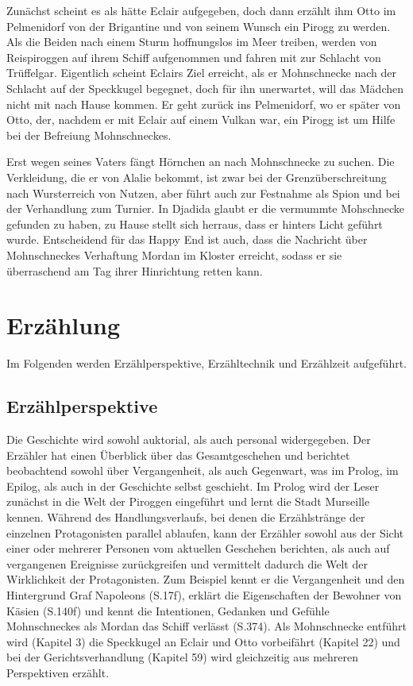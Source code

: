 {Zunächst scheint es als hätte Eclair aufgegeben, doch dann erzählt ihm Otto im Pelmenidorf von der Brigantine und von seinem Wunsch ein Pirogg zu werden. Als die Beiden nach einem Sturm hoffnungslos im Meer treiben, werden von Reispiroggen auf ihrem Schiff aufgenommen und fahren mit zur Schlacht von Trüffelgar. Eigentlich scheint Eclairs Ziel erreicht, als er Mohnschnecke nach der Schlacht auf der Speckkugel begegnet, doch für ihn unerwartet, will das Mädchen nicht mit nach Hause kommen. Er geht zurück ins Pelmenidorf, wo er später von Otto, der, nachdem er mit Eclair auf einem Vulkan war, ein Pirogg ist um Hilfe bei der Befreiung Mohnschneckes.

Erst wegen seines Vaters fängt Hörnchen an nach Mohnschnecke zu suchen. Die Verkleidung, die er von Alalie bekommt, ist zwar bei der Grenzüberschreitung nach Wursterreich von Nutzen, aber führt auch zur Festnahme als Spion und bei der Verhandlung zum Turnier. In Djadida glaubt er die vermummte Mohschnecke gefunden zu haben, zu Hause stellt sich herraus, dass er hinters Licht geführt wurde. 
Entscheidend für das Happy End ist auch, dass die Nachricht über Mohnschneckes Verhaftung Mordan im Kloster erreicht, sodass er sie überraschend am Tag ihrer Hinrichtung retten kann.


\section{Erzählung}
Im Folgenden werden Erzählperspektive, Erzähltechnik und Erzählzeit aufgeführt.
\subsection{Erzählperspektive}

Die Geschichte wird sowohl auktorial, als auch personal widergegeben. Der Erzähler hat einen Überblick über das Gesamtgeschehen und berichtet  beobachtend sowohl über Vergangenheit, als auch Gegenwart, was im Prolog, im Epilog, als auch in der Geschichte selbst geschieht. 
Im Prolog wird der Leser zunächst in die Welt der Piroggen eingeführt und lernt die Stadt Murseille kennen. Während des Handlungsverlaufs, bei denen die Erzählstränge der einzelnen Protagonisten parallel ablaufen, kann der Erzähler sowohl aus der Sicht einer oder mehrerer Personen vom aktuellen Geschehen berichten, als auch auf vergangenen Ereignisse zurückgreifen und vermittelt dadurch die Welt der Wirklichkeit der Protagonisten. Zum Beispiel kennt er die Vergangenheit und den Hintergrund Graf Napoleons (S.17f), erklärt die Eigenschaften der Bewohner von Käsien (S.140f) und kennt die Intentionen, Gedanken und Gefühle Mohnschneckes als Mordan das Schiff verlässt (S.374). Als Mohnschnecke entführt wird (Kapitel 3) die Speckkugel an Eclair und Otto vorbeifährt (Kapitel 22) und bei der Gerichtsverhandlung (Kapitel 59) wird gleichzeitig aus mehreren Perspektiven erzählt.



}
